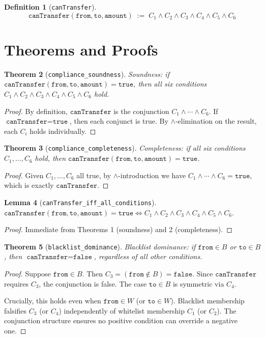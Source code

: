 \documentclass[11pt]{article}
\newtheorem{theorem}{Theorem}
\newtheorem{lemma}[theorem]{Lemma}
\newtheorem{definition}[theorem]{Definition}
\begin{document}
\begin{definition}[\texttt{canTransfer}]
\[
  \texttt{canTransfer}(\texttt{from}, \texttt{to}, \texttt{amount}) \;:=\; C_1 \wedge C_2 \wedge C_3 \wedge C_4 \wedge C_5 \wedge C_6
\]
\end{definition}


\section{Theorems and Proofs}

\begin{theorem}[\texttt{compliance\_soundness}]
Soundness: if $\texttt{canTransfer}(\texttt{from}, \texttt{to}, \texttt{amount}) = \texttt{true}$, then all six conditions $C_1 \wedge C_2 \wedge C_3 \wedge C_4 \wedge C_5 \wedge C_6$ hold.
\end{theorem}
\begin{proof}
By definition, $\texttt{canTransfer}$ is the conjunction $C_1 \wedge \cdots \wedge C_6$. If $\texttt{canTransfer} = \texttt{true}$, then each conjunct is true. By $\wedge$-elimination on the result, each $C_i$ holds individually.
\end{proof}

\begin{theorem}[\texttt{compliance\_completeness}]
Completeness: if all six conditions $C_1, \ldots, C_6$ hold, then $\texttt{canTransfer}(\texttt{from}, \texttt{to}, \texttt{amount}) = \texttt{true}$.
\end{theorem}
\begin{proof}
Given $C_1, \ldots, C_6$ all true, by $\wedge$-introduction we have $C_1 \wedge \cdots \wedge C_6 = \texttt{true}$, which is exactly $\texttt{canTransfer}$.
\end{proof}

\begin{lemma}[\texttt{canTransfer\_iff\_all\_conditions}]
$\texttt{canTransfer}(\texttt{from}, \texttt{to}, \texttt{amount}) = \texttt{true} \iff C_1 \wedge C_2 \wedge C_3 \wedge C_4 \wedge C_5 \wedge C_6$.
\end{lemma}
\begin{proof}
Immediate from Theorems 1 (soundness) and 2 (completeness).
\end{proof}

\begin{theorem}[\texttt{blacklist\_dominance}]
Blacklist dominance: if $\texttt{from} \in B$ or $\texttt{to} \in B$, then $\texttt{canTransfer} = \texttt{false}$, regardless of all other conditions.
\end{theorem}
\begin{proof}
Suppose $\texttt{from} \in B$. Then $C_3 = (\texttt{from} \notin B) = \texttt{false}$. Since $\texttt{canTransfer}$ requires $C_3$, the conjunction is false. The case $\texttt{to} \in B$ is symmetric via $C_4$.

Crucially, this holds even when $\texttt{from} \in W$ (or $\texttt{to} \in W$). Blacklist membership falsifies $C_3$ (or $C_4$) independently of whitelist membership $C_1$ (or $C_2$). The conjunction structure ensures no positive condition can override a negative one.
\end{proof}
\end{document}
